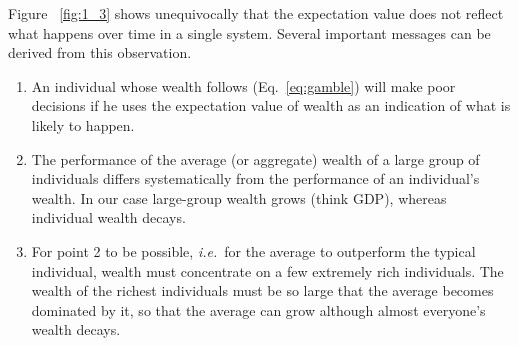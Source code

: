\documentclass[a4paper]{article}
\newcommand{\ie}{{\it i.e.}\ }
\newcommand{\eref}[1]{(Eq.~\ref{eq:#1})}
\newcommand{\Fref}[1]{Figure ~\ref{fig:#1}}
\begin{document}
\Fref{1_3} shows unequivocally that the expectation value does not reflect what happens over 
time in a single system. Several important messages can be derived from this observation. 

\begin{enumerate}
\item
An individual whose wealth follows \eref{gamble} will make poor decisions if he uses the expectation value of wealth 
as an indication of what is likely to happen.
\item
The performance of the average (or aggregate) wealth of a large group of individuals differs systematically from 
the performance of an individual's wealth. In our case large-group wealth grows (think GDP), whereas individual wealth 
decays.
\item
For point 2 to be possible, \ie for the average to outperform the typical individual, wealth must concentrate on a 
few extremely rich individuals. The wealth of the richest individuals must be so large that the average becomes 
dominated by 
it, 
so that
the average can grow although almost everyone's wealth decays.
\end{enumerate}
\end{document}
